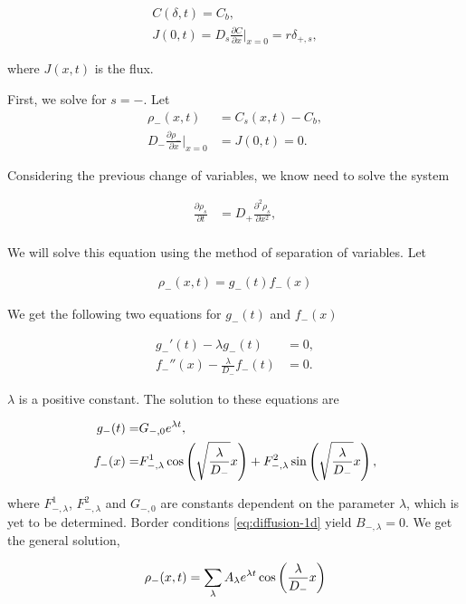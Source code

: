 \begin{align}
C(\delta, t) = C_b,\\
J(0,t) = D_s\frac{\partial C}{\partial x}\big|_{x=0} = r\delta_{+,s},
\label{eq:diffusion-bc}
\end{align}

where $J(x,t)$ is the flux.

First, we solve for $s=-$. Let 
\begin{align}
	\rho_-(x,t) &= C_s(x,t) - C_b,\\
	D_-\frac{\partial \rho_-}{\partial x}\big|_{x=0} &= J(0, t) = 0.
\end{align}

Considering the previous change of variables, we know need to solve the system

\begin{align}
\frac{\partial \rho_s}{\partial t} &= D_+ \frac{\partial^2 \rho_s}{\partial x^2},\\
\label{eq:diffusion-1d}
\end{align}


We will solve this equation using the method of separation of variables. Let

\begin{align}
	\rho_-(x,t) = g_-(t)f_-(x)
\end{align}

We get the following two equations for $g_-(t)$ and $f_-(x)$


\begin{align}
	g_-'(t) - \lambda g_-(t) &= 0,\\
	f_-''(x) - \frac{\lambda}{D_-} f_-(t) &= 0.
\end{align}

$\lambda$ is a positive constant. The solution to these equations are

\begin{align}
	g_-(t) =& G_{-,0}e^{\lambda t},\\
	f_-(x) =& F^1_{-,\lambda}\cos\left({{\sqrt{\frac{\lambda}{D_-}} x}}\right) + F^2_{-,\lambda}\sin\left({\sqrt{\frac{\lambda}{D_-}} x}\right),
\end{align}

where $F^1_{-,\lambda}$, $F^2_{-,\lambda}$ and $G_{-,0}$ are constants dependent on the parameter $\lambda$, which is yet to be determined. Border conditions \ref{eq:diffusion-1d} yield $B_{-,\lambda} = 0$. We get the general solution,


\begin{align}
	\rho_-(x,t) = \sum_{\lambda} A_\lambda e^{\lambda t} \cos\left({\frac{\lambda}{D_-} x}\right)
\end{align}

